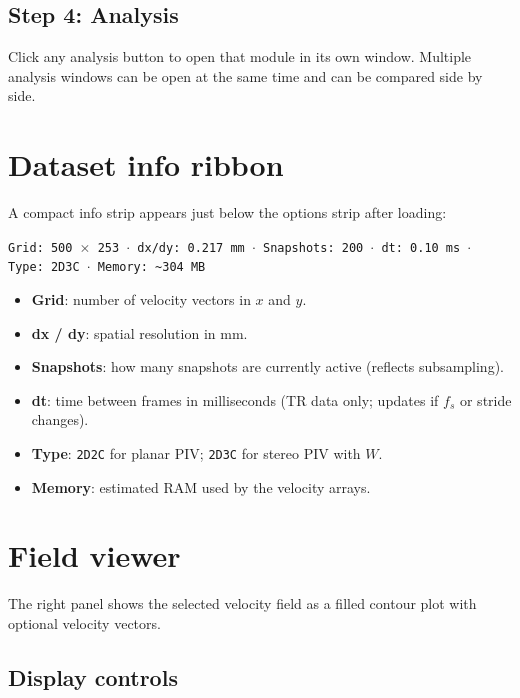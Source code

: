\documentclass[11pt, a4paper]{report}
\begin{document}
\subsection{Step 4: Analysis}

Click any analysis button to open that module in its own window. Multiple analysis windows can be open at the same time and can be compared side by side.

\section{Dataset info ribbon}
\label{sec:datasetinfo}

A compact info strip appears just below the options strip after loading:

\begin{center}
\texttt{Grid: 500\,$\times$\,253 $\cdot$ dx/dy: 0.217\,mm $\cdot$ Snapshots: 200 $\cdot$ dt: 0.10\,ms $\cdot$ Type: 2D3C $\cdot$ Memory: \textasciitilde{}304\,MB}
\end{center}

\begin{itemize}[leftmargin=1.5em]
  \item \textbf{Grid}: number of velocity vectors in $x$ and $y$.
  \item \textbf{dx / dy}: spatial resolution in mm.
  \item \textbf{Snapshots}: how many snapshots are currently active (reflects subsampling).
  \item \textbf{dt}: time between frames in milliseconds (TR data only; updates if $f_s$ or stride changes).
  \item \textbf{Type}: \texttt{2D2C} for planar PIV; \texttt{2D3C} for stereo PIV with $W$.
  \item \textbf{Memory}: estimated RAM used by the velocity arrays.
\end{itemize}

\section{Field viewer}

The right panel shows the selected velocity field as a filled contour plot with optional velocity vectors.

\subsection{Display controls}
\end{document}
